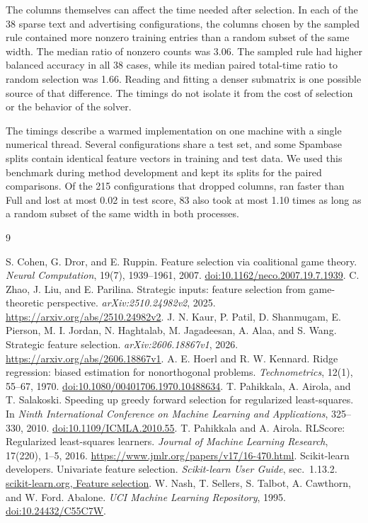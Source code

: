\documentclass[11pt,a4paper]{article}
\begin{document}
The columns themselves can affect the time needed after selection. In each of the 38 sparse text and advertising configurations, the columns chosen by the sampled rule contained more nonzero training entries than a random subset of the same width. The median ratio of nonzero counts was 3.06. The sampled rule had higher balanced accuracy in all 38 cases, while its median paired total-time ratio to random selection was 1.66. Reading and fitting a denser submatrix is one possible source of that difference. The timings do not isolate it from the cost of selection or the behavior of the solver.

The timings describe a warmed implementation on one machine with a single numerical thread. Several configurations share a test set, and some Spambase splits contain identical feature vectors in training and test data. We used this benchmark during method development and kept its splits for the paired comparisons. Of the 215 configurations that dropped columns, ran faster than Full and lost at most 0.02 in test score, 83 also took at most 1.10 times as long as a random subset of the same width in both processes.

\begin{thebibliography}{9}\small\raggedright
\enlargethispage{\baselineskip}
\setlength{\itemsep}{0pt}
 S. Cohen, G. Dror, and E. Ruppin. Feature selection via coalitional game theory. \emph{Neural Computation}, 19(7), 1939--1961, 2007. \href{https://doi.org/10.1162/neco.2007.19.7.1939}{doi:10.1162/neco.2007.19.7.1939}.
 C. Zhao, J. Liu, and E. Parilina. Strategic inputs: feature selection from game-theoretic perspective. \emph{arXiv:2510.24982v2}, 2025. \url{https://arxiv.org/abs/2510.24982v2}.
 J. N. Kaur, P. Patil, D. Shanmugam, E. Pierson, M. I. Jordan, N. Haghtalab, M. Jagadeesan, A. Alaa, and S. Wang. Strategic feature selection. \emph{arXiv:2606.18867v1}, 2026. \url{https://arxiv.org/abs/2606.18867v1}.
 A. E. Hoerl and R. W. Kennard. Ridge regression: biased estimation for nonorthogonal problems. \emph{Technometrics}, 12(1), 55--67, 1970. \href{https://doi.org/10.1080/00401706.1970.10488634}{doi:10.1080/00401706.1970.10488634}.
 T. Pahikkala, A. Airola, and T. Salakoski. Speeding up greedy forward selection for regularized least-squares. In \emph{Ninth International Conference on Machine Learning and Applications}, 325--330, 2010. \href{https://doi.org/10.1109/ICMLA.2010.55}{doi:10.1109/ICMLA.2010.55}.
 T. Pahikkala and A. Airola. RLScore: Regularized least-squares learners. \emph{Journal of Machine Learning Research}, 17(220), 1--5, 2016. \url{https://www.jmlr.org/papers/v17/16-470.html}.
 Scikit-learn developers. Univariate feature selection. \emph{Scikit-learn User Guide}, sec.~1.13.2. \href{https://scikit-learn.org/stable/modules/feature_selection.html}{scikit-learn.org, Feature selection}.
 W. Nash, T. Sellers, S. Talbot, A. Cawthorn, and W. Ford. Abalone. \emph{UCI Machine Learning Repository}, 1995. \href{https://doi.org/10.24432/C55C7W}{doi:10.24432/C55C7W}.
\end{thebibliography}
\end{document}
